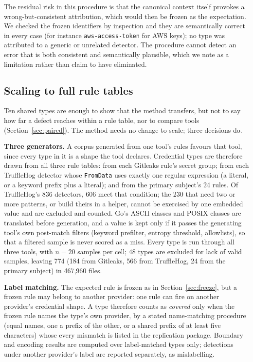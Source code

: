 \documentclass[pdflatex,sn-basic]{sn-jnl}
\begin{document}
The residual risk in this procedure is that the canonical context itself provokes a wrong-but-consistent attribution, which would then be frozen as the expectation. We checked the frozen identifiers by inspection and they are semantically correct in every case (for instance \texttt{aws-access-token} for AWS keys); no type was attributed to a generic or unrelated detector. The procedure cannot detect an error that is both consistent and semantically plausible, which we note as a limitation rather than claim to have eliminated.

\subsection{Scaling to full rule tables}
\label{sec:scale}

Ten shared types are enough to show that the method transfers, but not to say how far a defect reaches within a rule table, nor to compare tools (Section~\ref{sec:paired}). The method needs no change to scale; three decisions do.

\textbf{Three generators.} A corpus generated from one tool's rules favours that tool, since every type in it is a shape the tool declares. Credential types are therefore drawn from all three rule tables: from each Gitleaks rule's secret group; from each TruffleHog detector whose \texttt{FromData} uses exactly one regular expression (a literal, or a keyword prefix plus a literal); and from the primary subject's 24 rules. Of TruffleHog's 836 detectors, 606 meet that condition; the 230 that need two or more patterns, or build theirs in a helper, cannot be exercised by one embedded value and are excluded and counted. Go's ASCII classes and POSIX classes are translated before generation, and a value is kept only if it passes the generating tool's own post-match filters (keyword prefilter, entropy threshold, allowlists), so that a filtered sample is never scored as a miss. Every type is run through all three tools, with $n=20$ samples per cell; 48 types are excluded for lack of valid samples, leaving 774 (184 from Gitleaks, 566 from TruffleHog, 24 from the primary subject) in 467{,}960 files.

\textbf{Label matching.} The expected rule is frozen as in Section~\ref{sec:freeze}, but a frozen rule may belong to another provider: one rule can fire on another provider's credential shape. A type therefore counts as \emph{covered} only when the frozen rule names the type's own provider, by a stated name-matching procedure (equal names, one a prefix of the other, or a shared prefix of at least five characters) whose every mismatch is listed in the replication package. Boundary and encoding results are computed over label-matched types only; detections under another provider's label are reported separately, as mislabelling.
\end{document}
